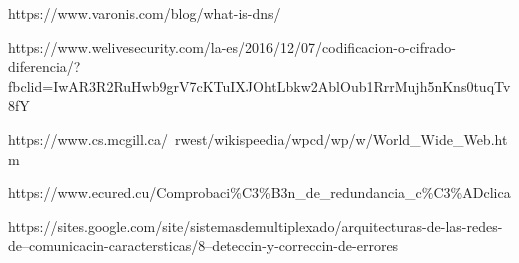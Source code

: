 \documentclass[spanish,12pt,letterpaper]{article}
\begin{document}
\begin{thebibliography}{9}
  https://www.varonis.com/blog/what-is-dns/
  
  https://www.welivesecurity.com/la-es/2016/12/07/codificacion-o-cifrado-diferencia/?fbclid=IwAR3R2RuHwb9grV7cKTuIXJOhtLbkw2AblOub1RrrMujh5nKns0tuqTv8fY
  
  https://www.cs.mcgill.ca/~rwest/wikispeedia/wpcd/wp/w/World\_Wide\_Web.htm
  
  https://www.ecured.cu/Comprobaci\%C3\%B3n\_de\_redundancia\_c\%C3\%ADclica

  https://sites.google.com/site/sistemasdemultiplexado/arquitecturas-de-las-redes-de--comunicacin-caractersticas/8--deteccin-y-correccin-de-errores


\end{thebibliography}
\end{document}
